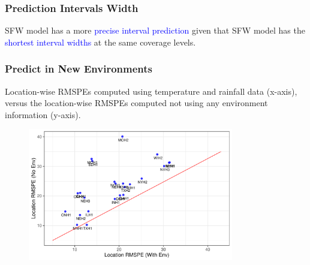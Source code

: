 \documentclass{beamer}
\begin{document}
\begin{frame}
	\frametitle{Prediction Intervals Width}

	
	\begin{table}[H]
	\caption*{  \textit{ the median credible interval widths of LM, FW, and SFW models at $90\%$ and $95\%$ credible levels are provided. }}
\end{table}
	
	\vspace{1.5em}
	SFW model has a more \textcolor{blue}{precise interval prediction} given that SFW model has the \textcolor{blue}{shortest interval widths} at the same coverage levels.
	
	
\end{frame}





\begin{frame}
	\frametitle{Predict in New Environments}
	Location-wise RMSPEs computed using temperature and rainfall data (x-axis), versus the location-wise RMSPEs computed not using any environment information (y-axis). 
	\begin{figure}[H]
		\centering
		\includegraphics[width = 0.8\textwidth]{type3pred1.pdf}
	\end{figure}
	
\end{frame}
\end{document}
